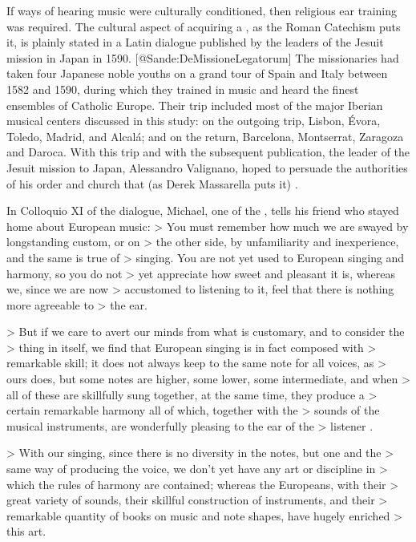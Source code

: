 If ways of hearing music were culturally conditioned, then religious ear training was required.
The cultural aspect of acquiring a , as the Roman Catechism puts it, is plainly stated in a Latin dialogue published by the leaders of the Jesuit mission in Japan in 1590.
[@Sande:DeMissioneLegatorum]
The missionaries had taken four Japanese noble youths on a grand tour of Spain and Italy between 1582 and 1590, during which they trained in music and heard the finest ensembles of Catholic Europe.
Their trip included most of the major Iberian musical centers discussed in this study: on the outgoing trip, Lisbon, Évora, Toledo, Madrid, and Alcalá; and on the return, Barcelona, Montserrat, Zaragoza and Daroca.
With this trip and with the subsequent publication, the leader of the Jesuit mission to Japan, Alessandro Valignano, hoped to persuade the authorities of his order and church that (as Derek Massarella puts it) .
\Autocite[4]{Massarella:JapaneseTravellers}

In Colloquio XI of the dialogue, Michael, one of the , tells his friend who stayed home about European music:
> You must remember \Dots{} how much we are swayed by longstanding custom, or on > the other side, by unfamiliarity and inexperience, and the same is true of > singing. You are not yet used to European singing and harmony, so you do not > yet appreciate how sweet and pleasant it is, whereas we, since we are now > accustomed to listening to it, feel that there is nothing more agreeable to > the ear.

> But if we care to avert our minds from what is customary, and to consider the > thing in itself, we find that European singing is in fact composed with > remarkable skill; it does not always keep to the same note for all voices, as > ours does, but some notes are higher, some lower, some intermediate, and when > all of these are skillfully sung together, at the same time, they produce a > certain remarkable harmony \Dots{} all of which, \Dots{} together with the > sounds of the musical instruments, are wonderfully pleasing to the ear of the > listener \Dots{}.

> With our singing, since there is no diversity in the notes, but one and the > same way of producing the voice, we don't yet have any art or discipline in > which the rules of harmony are contained; whereas the Europeans, with their > great variety of sounds, their skillful construction of instruments, and their > remarkable quantity of books on music and note shapes, have hugely enriched > this art.
\Autocite[155-156]{Massarella:JapaneseTravellers}

